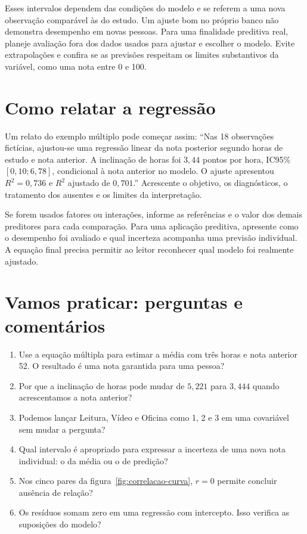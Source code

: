 Esses intervalos dependem das condições do modelo e se referem a uma nova observação comparável às do estudo. Um ajuste bom no próprio banco não demonstra desempenho em novas pessoas. Para uma finalidade preditiva real, planeje avaliação fora dos dados usados para ajustar e escolher o modelo. Evite extrapolações e confira se as previsões respeitam os limites substantivos da variável, como uma nota entre 0 e 100.

\section{Como relatar a regressão}

Um relato do exemplo múltiplo pode começar assim: ``Nas 18 observações fictícias, ajustou-se uma regressão linear da nota posterior segundo horas de estudo e nota anterior. A inclinação de horas foi $3{,}44$ pontos por hora, IC95\% $[0{,}10;6{,}78]$, condicional à nota anterior no modelo. O ajuste apresentou $R^2=0{,}736$ e $R^2$ ajustado de $0{,}701$.'' Acrescente o objetivo, os diagnósticos, o tratamento dos ausentes e os limites da interpretação.

Se forem usados fatores ou interações, informe as referências e o valor dos demais preditores para cada comparação. Para uma aplicação preditiva, apresente como o desempenho foi avaliado e qual incerteza acompanha uma previsão individual. A equação final precisa permitir ao leitor reconhecer qual modelo foi realmente ajustado.

\section{Vamos praticar: perguntas e comentários}

\begin{enumerate}
  \item Use a equação múltipla para estimar a média com três horas e nota anterior 52. O resultado é uma nota garantida para uma pessoa?
  \item Por que a inclinação de horas pode mudar de $5{,}221$ para $3{,}444$ quando acrescentamos a nota anterior?
  \item Podemos lançar Leitura, Vídeo e Oficina como 1, 2 e 3 em uma covariável sem mudar a pergunta?
  \item Qual intervalo é apropriado para expressar a incerteza de uma nova nota individual: o da média ou o de predição?
  \item Nos cinco pares da figura~\ref{fig:correlacao-curva}, $r=0$ permite concluir ausência de relação?
  \item Os resíduos somam zero em uma regressão com intercepto. Isso verifica as suposições do modelo?
\end{enumerate}

